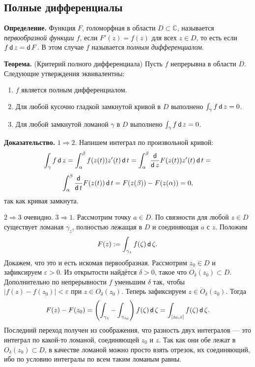 \subsection{Полные дифференциалы}

\textbf{Определение.} Функция $F$, голоморфная в области $D \subset \mathbb C$, называется \textit{первообразной функции $f$}, если $F'(z) = f(z)$ для всех $z \in D$, то есть если $f \operatorname{\mathsf d} z = \operatorname{\mathsf d} F$.
В этом случае $f$ называется \textit{полным дифференциалом}.

\textbf{Теорема.} (Критерий полного дифференциала) Пусть $f$ непрерывна в области $D$.
Следующие утверждения эквивалентны:
\begin{enumerate}
    \item $f$ является полным дифференциалом.
    \item Для любой кусочно гладкой замкнутой кривой в $D$ выполнено $\int_\gamma f \operatorname{\mathsf d} z = 0$.
    \item Для любой замкнутой ломаной $\gamma$ в $D$ выполнено $\int_\gamma f \operatorname{\mathsf d} z = 0$.
\end{enumerate}

\textbf{Доказательство.} $1 \Rightarrow 2$. Напишем интеграл по произвольной кривой:
\[
    \int_\gamma f \operatorname{\mathsf d} z = \int_\alpha^\beta f(z(t)) z'(t) \operatorname{\mathsf d} t = \int_\alpha^\beta \frac{\operatorname{\mathsf d}}{\operatorname{\mathsf d} z} F(z(t)) z'(t) \operatorname{\mathsf d} t =
\]
\[
    \int_\alpha^\beta \frac{\operatorname{\mathsf d}}{\operatorname{\mathsf d} t} F(z(t)) \operatorname{\mathsf d} t = F(z(\beta)) - F(z(\alpha)) = 0,
\]
так как кривая замкнута.

$2 \Rightarrow 3$ очевидно. $3 \Rightarrow 1$.
Рассмотрим точку $a \in D$.
По связности для любой $z \in D$ существует ломаная $\gamma_z$, полностью лежащая в $D$ и соединяющая $a$ с $z$.
Положим
\[
    F(z) := \int_{\gamma_z} f(\zeta) \operatorname{\mathsf d} \zeta.
\]
Докажем, что это и есть искомая первообразная.
Рассмотрим $z_0 \in D$ и зафиксируем $\varepsilon > 0$.
Из открытости найдётся $\delta > 0$, такое что $O_\delta(z_0) \subset D$.
Дополнительно по непрерывности $f$ уменьшим $\delta$ так, чтобы $|f(z) - f(z_0)| < \varepsilon$ при $z \in O_\delta(z_0)$.
Теперь зафиксируем $z \in \dot O_\delta(z_0)$.
Тогда
\[
    F(z) - F(z_0) = \left( \int_{\gamma_z} - \int_{\gamma_{z_0}} \right) f(\zeta) \operatorname{\mathsf d} \zeta = \int_{[z_0, z]} f(\zeta) \operatorname{\mathsf d} \zeta.
\]
Последний переход получен из соображения, что разность двух интегралов --- это интеграл по какой-то ломаной, соединяющей $z_0$ и $z$.
Так как они обе лежат в $O_\delta(z_0) \subset D$, в качестве ломаной можно просто взять отрезок, их соединяющий, ибо по условию интегралы по всем таким ломаным равны.

